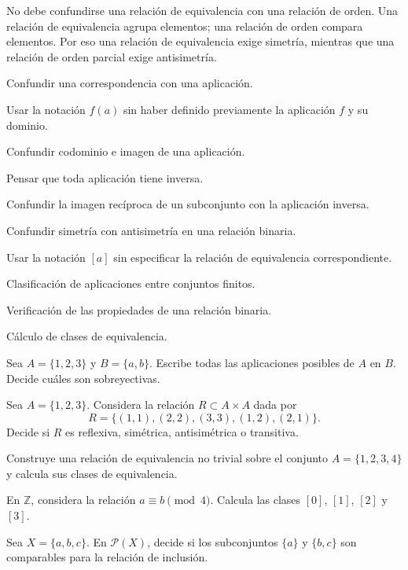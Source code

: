 \begin{advertencia}
No debe confundirse una relación de equivalencia con una relación de orden. Una relación de equivalencia agrupa elementos; una relación de orden compara elementos. Por eso una relación de equivalencia exige simetría, mientras que una relación de orden parcial exige antisimetría.
\end{advertencia}

\begin{erroresfrecuentes}
  \item Confundir una correspondencia con una aplicación.
  \item Usar la notación \(f(a)\) sin haber definido previamente la aplicación \(f\) y su dominio.
  \item Confundir codominio e imagen de una aplicación.
  \item Pensar que toda aplicación tiene inversa.
  \item Confundir la imagen recíproca de un subconjunto con la aplicación inversa.
  \item Confundir simetría con antisimetría en una relación binaria.
  \item Usar la notación \([a]\) sin especificar la relación de equivalencia correspondiente.
\end{erroresfrecuentes}

\begin{seminario}
  \item Clasificación de aplicaciones entre conjuntos finitos.
  \item Verificación de las propiedades de una relación binaria.
  \item Cálculo de clases de equivalencia.
\end{seminario}

\begin{ejerciciospropuestos}
  \item Sea \(A=\{1,2,3\}\) y \(B=\{a,b\}\). Escribe todas las aplicaciones posibles de \(A\) en \(B\). Decide cuáles son sobreyectivas.
  \item Sea \(A=\{1,2,3\}\). Considera la relación \(R\subset A\times A\) dada por
  \[
  R=\{(1,1),(2,2),(3,3),(1,2),(2,1)\}.
  \]
  Decide si \(R\) es reflexiva, simétrica, antisimétrica o transitiva.
  \item Construye una relación de equivalencia no trivial sobre el conjunto \(A=\{1,2,3,4\}\) y calcula sus clases de equivalencia.
  \item En \(\mathbb{Z}\), considera la relación \(a\equiv b\pmod 4\). Calcula las clases \([0]\), \([1]\), \([2]\) y \([3]\).
  \item Sea \(X=\{a,b,c\}\). En \(\mathcal{P}(X)\), decide si los subconjuntos \(\{a\}\) y \(\{b,c\}\) son comparables para la relación de inclusión.
\end{ejerciciospropuestos}

